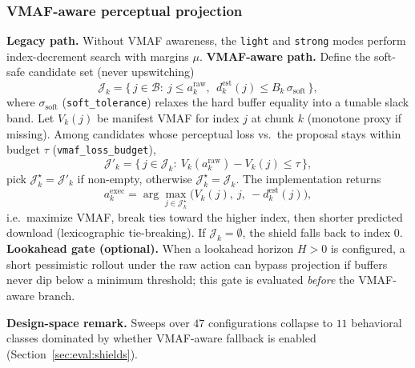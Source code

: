 \documentclass[preprint,12pt,times]{elsarticle}
\providecommand{\VShieldVariants}{47}
\providecommand{\VShieldBehaviors}{11}
\begin{document}
\subsubsection{VMAF-aware perceptual projection}\label{sec:method:shield:v12}

\textbf{Legacy path.} Without VMAF awareness, the \texttt{light} and \texttt{strong} modes perform index-decrement search with margins \(\mu\).
\textbf{VMAF-aware path.}
Define the soft-safe candidate set (never upswitching)
\begin{equation}
\label{eq:softsafe}
    \mathcal{J}_k
    = \Big\{\, j\in\mathcal{B}:\ j\le a^{\mathrm{raw}}_k,\ \ d^{\mathrm{est}}_k(j)\le B_k\,\sigma_{\mathrm{soft}}\,\Big\},
\end{equation}
where \(\sigma_{\mathrm{soft}}\) (\texttt{soft\_tolerance}) relaxes the hard buffer equality into a tunable slack band.
Let \(V_k(j)\) be manifest VMAF for index \(j\) at chunk \(k\) (monotone proxy if missing).
Among candidates whose perceptual loss vs.\ the proposal stays within budget \(\tau\) (\texttt{vmaf\_loss\_budget}),
\begin{equation}
    \mathcal{J}'_k = \Big\{\, j\in\mathcal{J}_k:\ V_k(a^{\mathrm{raw}}_k)-V_k(j)\le \tau\,\Big\},
\end{equation}
pick \(\mathcal{J}^\star_k=\mathcal{J}'_k\) if non-empty, otherwise \(\mathcal{J}^\star_k=\mathcal{J}_k\).
The implementation returns
\begin{equation}
    a^{\mathrm{exec}}_k = \arg\max_{j\in\mathcal{J}^\star_k} \Big( V_k(j),\ j,\ -d^{\mathrm{est}}_k(j) \Big),
\end{equation}
i.e.\ maximize VMAF, break ties toward the higher index, then shorter predicted download (lexicographic tie-breaking).
If \(\mathcal{J}_k=\emptyset\), the shield falls back to index \(0\).
\textbf{Lookahead gate (optional).} When a lookahead horizon $H>0$ is configured, a short pessimistic rollout under the raw action can bypass projection if buffers never dip below a minimum threshold; this gate is evaluated \emph{before} the VMAF-aware branch.

\textbf{Design-space remark.} Sweeps over \(\VShieldVariants\) configurations collapse to \(\VShieldBehaviors\) behavioral classes dominated by whether VMAF-aware fallback is enabled (Section~\ref{sec:eval:shields}).
\end{document}
